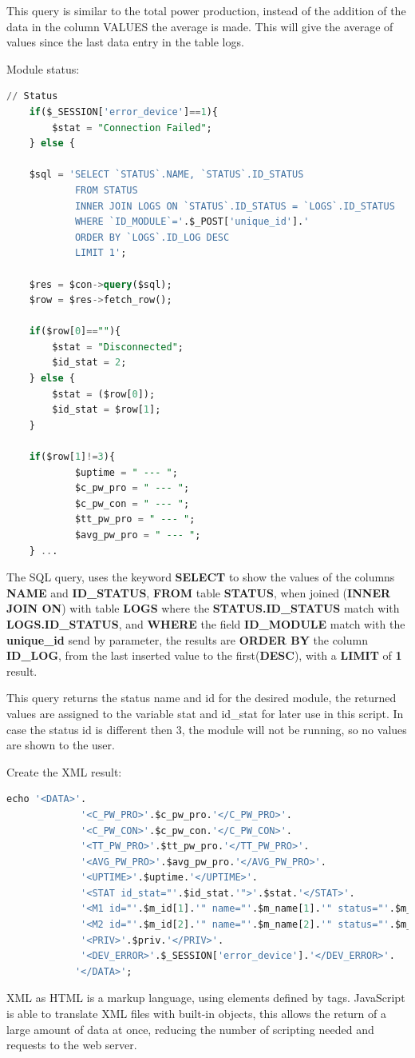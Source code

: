 This query is similar to the total power production, instead of the addition of the data in the column VALUES the average is made. This will give the average of values since the last data entry in the table logs.

Module status:
\begin{lstlisting}[language=sql]
	// Status
	if($_SESSION['error_device']==1){
		$stat = "Connection Failed";
	} else {
	
	$sql = 'SELECT `STATUS`.NAME, `STATUS`.ID_STATUS
			FROM STATUS 
			INNER JOIN LOGS ON `STATUS`.ID_STATUS = `LOGS`.ID_STATUS
			WHERE `ID_MODULE`='.$_POST['unique_id'].'
			ORDER BY `LOGS`.ID_LOG DESC 
			LIMIT 1';
	
	$res = $con->query($sql);
	$row = $res->fetch_row();
	
	if($row[0]==""){
		$stat = "Disconnected";
		$id_stat = 2;
	} else {
		$stat = ($row[0]);
		$id_stat = $row[1];
	}
	
	if($row[1]!=3){
			$uptime = " --- ";
			$c_pw_pro = " --- ";
			$c_pw_con = " --- ";
			$tt_pw_pro = " --- ";
			$avg_pw_pro = " --- ";
	} ...
\end{lstlisting}

The SQL query, uses the keyword \textbf{SELECT} to show the values of the columns \textbf{NAME} and \textbf{ID\_STATUS}, \textbf{FROM} table \textbf{STATUS}, when joined (\textbf{INNER JOIN ON}) with table \textbf{LOGS} where the \textbf{STATUS.ID\_STATUS} match with \textbf{LOGS.ID\_STATUS}, and \textbf{WHERE} the field \textbf{ID\_MODULE} match with the \textbf{unique\_id} send by parameter, the results are \textbf{ORDER BY} the column \textbf{ID\_LOG}, from the last inserted value to the first(\textbf{DESC}), with a \textbf{LIMIT} of \textbf{1} result.

This query returns the status name and id for the desired module, the returned values are assigned to the variable stat and id\_stat for later use in this script. In case the status id is different then 3, the module will not be running, so no values are shown to the user.

Create the XML result:
\begin{lstlisting}[language=sql]
	echo '<DATA>'.
			 '<C_PW_PRO>'.$c_pw_pro.'</C_PW_PRO>'.
			 '<C_PW_CON>'.$c_pw_con.'</C_PW_CON>'.
			 '<TT_PW_PRO>'.$tt_pw_pro.'</TT_PW_PRO>'.
			 '<AVG_PW_PRO>'.$avg_pw_pro.'</AVG_PW_PRO>'.
			 '<UPTIME>'.$uptime.'</UPTIME>'.
			 '<STAT id_stat="'.$id_stat.'">'.$stat.'</STAT>'.
			 '<M1 id="'.$m_id[1].'" name="'.$m_name[1].'" status="'.$m_status[1].'" id_status="'.$m_id_status[1].'"></M1>'.
			 '<M2 id="'.$m_id[2].'" name="'.$m_name[2].'" status="'.$m_status[2].'" id_status="'.$m_id_status[2].'"></M2>'.
			 '<PRIV>'.$priv.'</PRIV>'.
			 '<DEV_ERROR>'.$_SESSION['error_device'].'</DEV_ERROR>'.
			'</DATA>';
\end{lstlisting}
XML as HTML is a markup language, using elements defined by tags. JavaScript is able to translate XML files with built-in objects, this allows the return of a large amount of data at once, reducing the number of scripting needed and requests to the web server.

